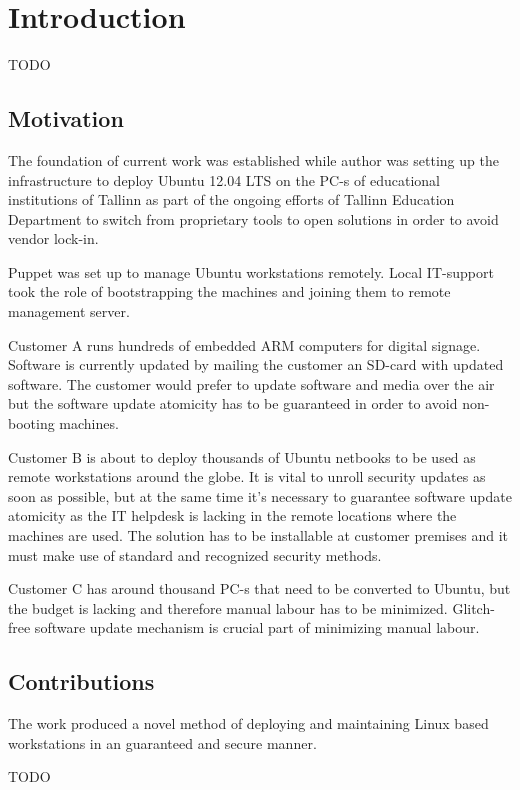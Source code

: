 \documentclass[a4paper,11pt]{kth-mag}
\begin{document}
\chapter{Introduction}
\label{chap:intro}

TODO

\section{Motivation}
\label{sec:mot}
The foundation of current work was established while author was setting up
the infrastructure to deploy Ubuntu 12.04 LTS on the PC-s of educational
institutions of Tallinn as part of the ongoing efforts of Tallinn Education
Department to switch from proprietary tools to open solutions
in order to avoid vendor lock-in.

Puppet was set up to manage Ubuntu workstations remotely. Local IT-support
took the role of bootstrapping the machines and joining them to remote
management server.

Customer A runs hundreds of embedded ARM computers for digital signage.
Software is currently updated by mailing the customer an SD-card with
updated software. The customer would prefer to update software and
media over the air but the software update atomicity has to be guaranteed
in order to avoid non-booting machines.

Customer B is about to deploy thousands of Ubuntu netbooks to be used as
remote workstations around the globe. It is vital to unroll security updates
as soon as possible, but at the same time it's necessary to guarantee
software update atomicity as the IT helpdesk is lacking in the remote
locations where the machines are used.
The solution has to be installable at customer premises and it
must make use of standard and recognized security methods.

Customer C has around thousand PC-s that need to be converted to Ubuntu,
but the budget is lacking and therefore manual labour has to be minimized.
Glitch-free software update mechanism is crucial part of minimizing manual
labour.

\section{Contributions}

The work produced a novel method of deploying and maintaining Linux
based workstations in an guaranteed and secure manner.

TODO
\end{document}
